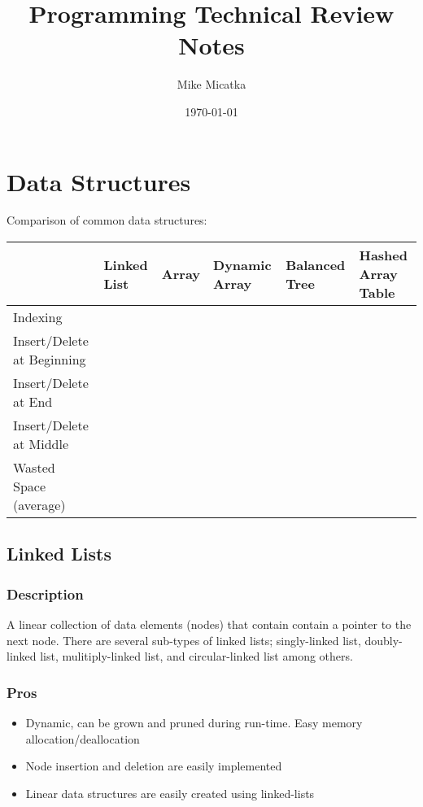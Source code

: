\documentclass{article}
\begin{document}
\title{Programming Technical Review Notes}
\author{Mike Micatka}
\date{\today}

\maketitle

\tableofcontents

\section{Data Structures}

Comparison of common data structures:

\begin{tabular}{|l|l|l|l|l|l|}

\hline

 & Linked List & Array & Dynamic Array & Balanced Tree & Hashed Array Table \\ \hline 
 Indexing & & & & & \\ \hline
 Insert/Delete at Beginning & & & & & \\ \hline
 Insert/Delete at End & & & & & \\ \hline
 Insert/Delete at Middle & & & & & \\ \hline
 Wasted Space (average) & & & & & \\ \hline
 
\end{tabular}

\subsection{Linked Lists}

\subsubsection{Description}

A linear collection of data elements (nodes) that contain contain a pointer to the next node. There are several sub-types of linked lists; singly-linked list, doubly-linked list, mulitiply-linked list, and circular-linked list among others.

\subsubsection{Pros}

\begin{itemize}
	\item Dynamic, can be grown and pruned during run-time. Easy memory allocation/deallocation
	
	\item Node insertion and deletion are easily implemented
	
	\item Linear data structures are easily created using linked-lists
	
\end{itemize}
\end{document}
